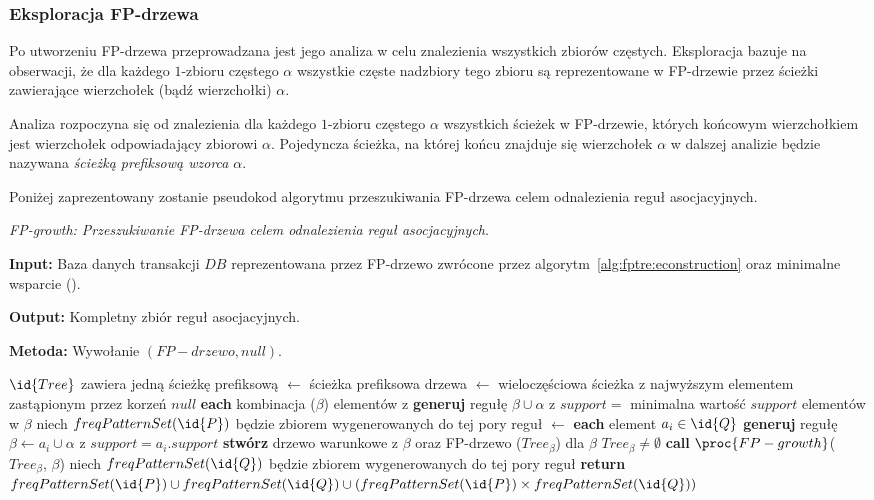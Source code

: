 \subsubsection{Eksploracja FP-drzewa}
Po utworzeniu FP-drzewa przeprowadzana jest jego analiza w celu znalezienia wszystkich zbiorów częstych. Eksploracja bazuje na obserwacji, że dla każdego $1$-zbioru częstego $\alpha$ wszystkie częste nadzbiory tego zbioru są reprezentowane w FP-drzewie przez ścieżki zawierające wierzchołek (bądź wierzchołki) $\alpha$.

Analiza rozpoczyna się od znalezienia dla każdego $1$-zbioru częstego $\alpha$ wszystkich ścieżek w FP-drzewie, których końcowym wierzchołkiem jest wierzchołek odpowiadający zbiorowi $\alpha$. Pojedyncza ścieżka, na której końcu znajduje się wierzchołek $\alpha$ w dalszej analizie będzie nazywana \emph{ścieżką prefiksową wzorca} $\alpha$.

Poniżej zaprezentowany zostanie pseudokod algorytmu przeszukiwania FP-drzewa celem odnalezienia reguł asocjacyjnych.

\begin{alg}
	\emph{FP-growth: Przeszukiwanie FP-drzewa celem odnalezienia reguł asocjacyjnych}.

	\textbf{Input:} Baza danych transakcji $DB$ reprezentowana przez FP-drzewo zwrócone przez algorytm~\ref{alg:fptre:econstruction} oraz minimalne wsparcie ().

	\textbf{Output:} Kompletny zbiór reguł asocjacyjnych.

	\textbf{Metoda:} Wywołanie $(FP-drzewo, null)$.

	
\begin{codebox}
		\li \If $\id{Tree}$ zawiera jedną ścieżkę prefiksową
			\li \Then
				 $\gets$ ścieżka prefiksowa drzewa 
				\li {} $\gets$ wieloczęściowa ścieżka z najwyższym elementem zastąpionym przez korzeń $null$
					\li \For \textbf{each} kombinacja ($\beta$) elementów z 
						\li \Do
							\textbf{generuj} regułę $\beta \cup \alpha$ z $support =$ minimalna wartość $support$ elementów w $\beta$
							\li niech $freqPatternSet(\id{P})$ będzie zbiorem wygenerowanych do tej pory reguł
						\End
			\li \Else 
				 $\gets$ 
				\li \For \textbf{each} element $a_i \in \id{Q}$
					\li \Do
					\textbf{generuj} regułę $\beta \gets a_i \cup \alpha$ z $support = a_i.support$
					\li \textbf{stwórz} drzewo warunkowe z $\beta$ oraz FP-drzewo ($Tree_{\beta}$) dla $\beta$
						\li	\If $Tree_{\beta} \neq \emptyset$
							\li \Then
							\textbf{call} $\proc{FP-growth}$($Tree_{\beta}$, $\beta$)
								\End
							\li niech $freqPatternSet(\id{Q})$ będzie zbiorem wygenerowanych do tej pory reguł
						\End
				\End
		\li \textbf{return} $freqPatternSet(\id{P}) \cup freqPatternSet(\id{Q}) \cup (freqPatternSet(\id{P}) \times freqPatternSet(\id{Q}))$
		\End
\end{codebox}
\end{alg}